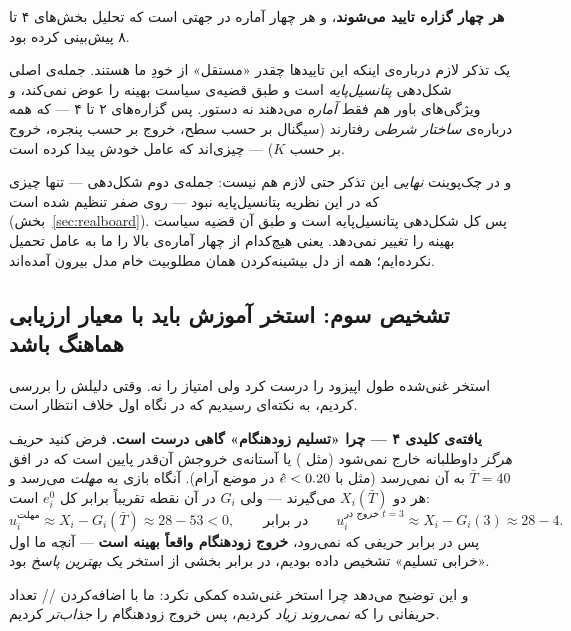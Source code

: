 \documentclass[12pt,a4paper]{article}
\begin{document}
\begin{answer}
\textbf{هر چهار گزاره تایید می‌شوند}، و هر چهار آماره در جهتی است که تحلیل
بخش‌های ۴ تا ۸ پیش‌بینی کرده بود.

یک تذکر لازم درباره‌ی اینکه این تاییدها چقدر «مستقل» از خودِ ما هستند.
جمله‌ی اصلی شکل‌دهی \emph{پتانسیل‌پایه} است و طبق قضیه‌ی
 سیاست بهینه را عوض نمی‌کند، و ویژگی‌های باور هم
فقط \emph{آماره} می‌دهند نه دستور. پس گزاره‌های ۲ تا ۴ — که همه درباره‌ی
\emph{ساختار شرطی} رفتارند (سیگنال بر حسب سطح، خروج بر حسب پنجره، خروج بر
حسب $K$) — چیزی‌اند که عامل خودش پیدا کرده است.

و در چک‌پوینت \emph{نهایی} این تذکر حتی لازم هم نیست: جمله‌ی دوم شکل‌دهی
— تنها چیزی که در این نظریه پتانسیل‌پایه نبود — روی صفر تنظیم شده است
(بخش~\ref{sec:realboard}). پس کل شکل‌دهی پتانسیل‌پایه است و طبق آن قضیه
سیاست بهینه را تغییر نمی‌دهد. یعنی هیچ‌کدام از چهار آماره‌ی بالا را
ما به عامل تحمیل نکرده‌ایم؛ همه از دل بیشینه‌کردن همان مطلوبیت خام مدل
بیرون آمده‌اند.
\end{answer}

\subsection{تشخیص سوم: استخر آموزش باید با معیار ارزیابی هماهنگ باشد}

استخر غنی‌شده طول اپیزود را درست کرد ولی امتیاز را نه. وقتی دلیلش را
بررسی کردیم، به نکته‌ای رسیدیم که در نگاه اول خلاف انتظار است.

\begin{findbox}
\textbf{یافته‌ی کلیدی ۴ — چرا «تسلیم زودهنگام» گاهی درست است.}
فرض کنید حریف \emph{هرگز} داوطلبانه خارج نمی‌شود (مثل ) یا آستانه‌ی
خروجش آن‌قدر پایین است که در افق $\bar T=40$ به آن نمی‌رسد (مثل
 با $\hat{e}<0.20$ در موضع آرام). آنگاه بازی به \emph{مهلت}
می‌رسد و هر دو $X_i(\bar T)$ می‌گیرند — ولی $G_i$ در آن نقطه تقریباً برابر
کل $e_i^0$ است:
\[
  u_i^{\text{مهلت}}\approx X_i-G_i(\bar T)\approx 28-53<0,
  \qquad\text{در برابر}\qquad
  u_i^{\text{خروج در }t=3}\approx X_i-G_i(3)\approx 28-4 .
\]
پس در برابر حریفی که نمی‌رود، \textbf{خروج زودهنگام واقعاً بهینه است} — آنچه
ما اول «خرابی تسلیم» تشخیص داده بودیم، در برابر بخشی از استخر یک
\emph{بهترین پاسخ} بود.

و این توضیح می‌دهد چرا استخر غنی‌شده کمکی نکرد: ما با اضافه‌کردن
// تعداد حریفانی را که \emph{نمی‌روند}
\emph{زیاد} کردیم، پس خروج زودهنگام را \emph{جذاب‌تر} کردیم.
\end{findbox}
\end{document}
